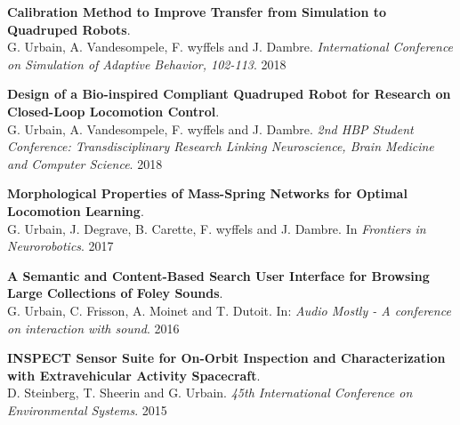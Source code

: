 \documentclass[a4paper]{deedy-resume} %
\begin{document}
\vspace{5pt}
\textbf{Calibration Method to Improve Transfer from Simulation to Quadruped Robots}. \\
G. Urbain, A. Vandesompele, F. wyffels and J. Dambre.
\textit{International Conference on Simulation of Adaptive Behavior, 102-113}. 2018

\vspace{5pt}
\textbf{Design of a Bio-inspired Compliant Quadruped Robot for Research on Closed-Loop Locomotion Control}.\\
G. Urbain, A. Vandesompele, F. wyffels and J. Dambre.
\textit{2nd HBP Student Conference: Transdisciplinary Research Linking Neuroscience, Brain Medicine and Computer Science}. 2018

\vspace{5pt}
\textbf{Morphological Properties of Mass-Spring Networks for Optimal Locomotion Learning}. \\
G. Urbain, J. Degrave, B. Carette, F. wyffels and J. Dambre. In \textit{Frontiers in Neurorobotics}. 2017

\vspace{5pt}
\textbf{A Semantic and Content-Based Search User Interface for Browsing Large Collections of Foley Sounds}. \\
G. Urbain, C. Frisson, A. Moinet and T. Dutoit. In: \textit{Audio Mostly - A conference on interaction with sound}. 2016

\vspace{5pt}
\textbf{INSPECT Sensor Suite for On-Orbit Inspection and Characterization with Extravehicular Activity Spacecraft}.\\
D. Steinberg, T. Sheerin and G. Urbain.
\textit{45th International Conference on Environmental Systems}. 2015

\vspace{15pt}
\end{document}
